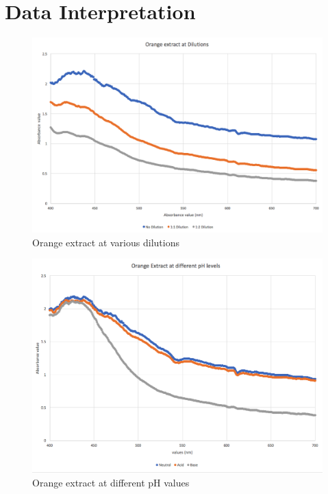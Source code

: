 \documentclass[10pt]{article}
\begin{document}
\section{Data Interpretation}
\begin{figure}[H]
\hfill\includegraphics[width=5in]{fig1}\hspace*{\fill}
\caption[Orange extract at various dilutions]{Orange extract at various dilutions}
\end{figure}
\begin{figure}[H]
\hfill\includegraphics[width=5in]{fig2}\hspace*{\fill}
\caption[Orange extract at different pH values]{Orange extract at different pH values}
\end{figure}
\end{document}
